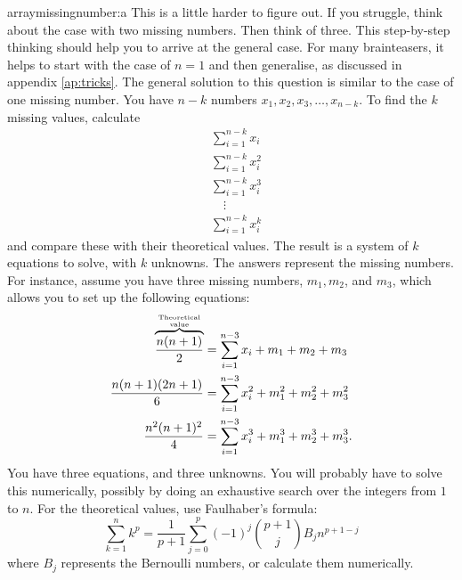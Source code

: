 \begin{subanswer}{arraymissingnumber:a}
This is a little harder to figure out.
If you struggle, think about the case with two missing numbers.
Then think of three.
This step-by-step thinking should help you to arrive at the general case.
For many brainteasers, it helps to start with the case of $n=1$ and then generalise, as discussed in appendix \ref{ap:tricks}.
The general solution to this question is similar to the case of one missing number.
You have $n-k$ numbers $x_1, x_2, x_3, \ldots , x_{n-k}$.
To find the $k$ missing values, calculate
\begin{align*}
& \sum_{i=1}^{n-k}{ x_i   } \\
& \sum_{i=1}^{n-k}{ x_i^2 } \\
& \sum_{i=1}^{n-k}{ x_i^3 } \\
& \quad\vdots \\
& \sum_{i=1}^{n-k}{ x_i^k }
\end{align*}
and compare these with their theoretical values.
The result is a system of $k$ equations to solve, with $k$ unknowns.
The answers represent the missing numbers.
For instance, assume you have three missing numbers, $m_1, m_2$, and $m_3$, which allows you to set up the following equations:
\begin{align*}
 \overbrace{\frac{n(n+1)}{2}}^{ \text{Theoretical} \atop \text{value} }
 &=
 \sum_{i=1}^{n-3}{ x_i }
+  m_1 + m_2 + m_3
\\
 \frac{n(n+1)(2n + 1)}{6}
 &=
 \sum_{i=1}^{n-3}{ x_i^2 }
+ m_1^2 + m_2^2 + m_3^2
\\
 \frac{n^2(n+1)^2}{4}
 &=
 \sum_{i=1}^{n-3}{ x_i^3 }
+ m_1^3 + m_2^3 + m_3^3
\text{.}
\end{align*}
You have three equations, and three unknowns.
You will probably have to solve this numerically, possibly by doing an exhaustive search over the integers from $1$ to $n$.
For the theoretical values, use Faulhaber's formula:
\[
  \sum_{k=1}^{n}{k^p} = \frac{1}{p+1} \sum_{j=0}^{p}{ (-1)^j \binom{p+1}{j} B_j n^{p+1-j} }
\]
where $B_j$ represents the Bernoulli numbers, or calculate them numerically.


\end{subanswer}



